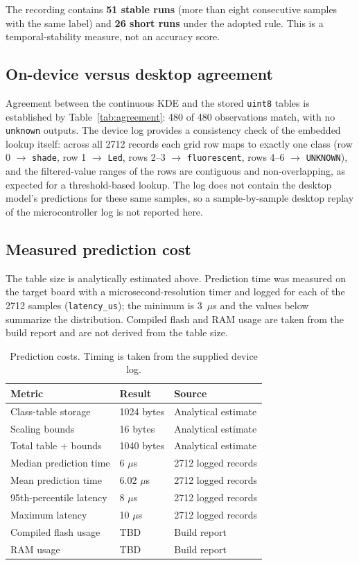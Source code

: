 \documentclass[conference]{IEEEtran}
\begin{document}
The recording contains \textbf{51 stable runs} (more than eight consecutive samples with the same label) and \textbf{26 short runs} under the adopted rule. This is a temporal-stability measure, not an accuracy score.

\subsection{On-device versus desktop agreement}
Agreement between the continuous KDE and the stored \texttt{uint8} tables is established by Table~\ref{tab:agreement}: 480 of 480 observations match, with no \texttt{unknown} outputs. The device log provides a consistency check of the embedded lookup itself: across all 2712 records each grid row maps to exactly one class (row 0 $\rightarrow$ \texttt{shade}, row 1 $\rightarrow$ \texttt{Led}, rows 2--3 $\rightarrow$ \texttt{fluorescent}, rows 4--6 $\rightarrow$ \texttt{UNKNOWN}), and the filtered-value ranges of the rows are contiguous and non-overlapping, as expected for a threshold-based lookup. The log does not contain the desktop model's predictions for these same samples, so a sample-by-sample desktop replay of the microcontroller log is not reported here.

\subsection{Measured prediction cost}
The table size is analytically estimated above. Prediction time was measured on the target board with a microsecond-resolution timer and logged for each of the 2712 samples (\texttt{latency\_us}); the minimum is 3~$\mu$s and the values below summarize the distribution. Compiled flash and RAM usage are taken from the build report and are not derived from the table size.

\begin{table}[H]
    \centering
    \caption{Prediction costs. Timing is taken from the supplied device log.}
    \label{tab:cost}
    \footnotesize\setlength{\tabcolsep}{3pt}
    \begin{tabular}{lll}
        \toprule
        Metric & Result & Source\\
        \midrule
        Class-table storage & 1024 bytes & Analytical estimate\\
        Scaling bounds & 16 bytes & Analytical estimate\\
        Total table + bounds & 1040 bytes & Analytical estimate\\
        Median prediction time & 6 $\mu$s & 2712 logged records\\
        Mean prediction time & 6.02 $\mu$s & 2712 logged records\\
        95th-percentile latency & 8 $\mu$s & 2712 logged records\\
        Maximum latency & 10 $\mu$s & 2712 logged records\\
        Compiled flash usage & TBD & Build report\\
        RAM usage & TBD & Build report\\
        \bottomrule
    \end{tabular}
\end{table}
\end{document}
